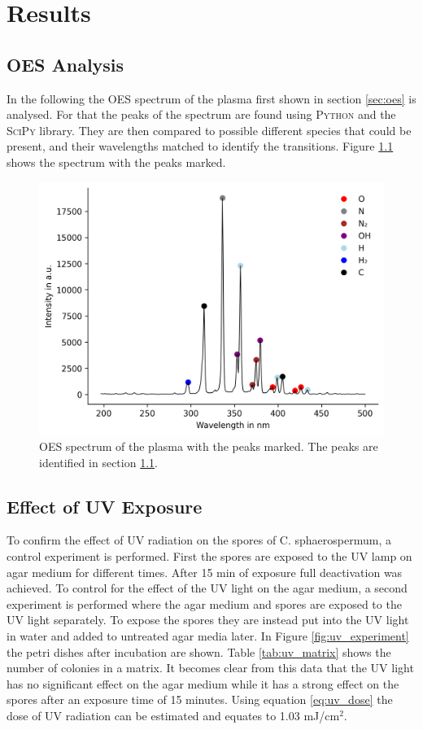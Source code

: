 \chapter{Results}
\label{chap:results}

\section{OES Analysis}
\label{sec:oes_analysis}
In the following the OES spectrum of the plasma first shown in section \ref{sec:oes} is analysed. For that the peaks of the spectrum are found using \textsc{Python} and the \textsc{SciPy} library. They are then compared to possible different species that could be present, and their wavelengths matched to identify the transitions. Figure \ref{fig:oes_analysis} shows the spectrum with the peaks marked. 

\begin{figure}
    \centering
    \includegraphics[width=.85\textwidth]{images/OES_analysis.png}
    \caption[OES spectrum with peaks marked]{OES spectrum of the plasma with the peaks marked. The peaks are identified in section \ref{sec:oes_analysis}.}
    \label{fig:oes_analysis}
\end{figure}

\section{Effect of UV Exposure}
To confirm the effect of UV radiation on the spores of C. sphaerospermum, a control experiment is performed. First the spores are exposed to the UV lamp on agar medium for different times. After 15 min of exposure full deactivation was achieved. To control for the effect of the UV light on the agar medium, a second experiment is performed where the agar medium and spores are exposed to the UV light separately. To expose the spores they are instead put into the UV light in water and added to untreated agar media later. In Figure \ref{fig:uv_experiment} the petri dishes after incubation are shown. Table \ref{tab:uv_matrix} shows the number of colonies in a matrix. It becomes clear from this data that the UV light has no significant effect on the agar medium while it has a strong effect on the spores after an exposure time of 15 minutes. Using equation \ref{eq:uv_dose} the dose of UV radiation can be estimated and equates to 1.03 mJ/cm$^2$.

